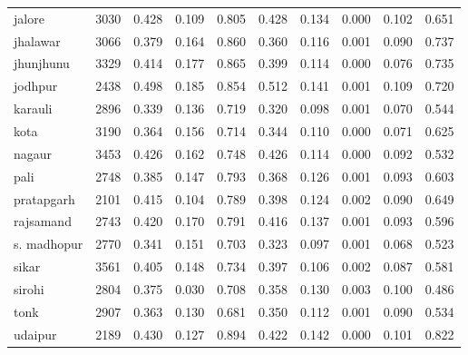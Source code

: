 \begin{table}[!h]
\begin{tabular}[t]{lrrrrrrrrr}
jalore & 3030 & 0.428 & 0.109 & 0.805 & 0.428 & 0.134 & 0.000 & 0.102 & 0.651\\
jhalawar & 3066 & 0.379 & 0.164 & 0.860 & 0.360 & 0.116 & 0.001 & 0.090 & 0.737\\
\addlinespace
jhunjhunu & 3329 & 0.414 & 0.177 & 0.865 & 0.399 & 0.114 & 0.000 & 0.076 & 0.735\\
jodhpur & 2438 & 0.498 & 0.185 & 0.854 & 0.512 & 0.141 & 0.001 & 0.109 & 0.720\\
karauli & 2896 & 0.339 & 0.136 & 0.719 & 0.320 & 0.098 & 0.001 & 0.070 & 0.544\\
kota & 3190 & 0.364 & 0.156 & 0.714 & 0.344 & 0.110 & 0.000 & 0.071 & 0.625\\
nagaur & 3453 & 0.426 & 0.162 & 0.748 & 0.426 & 0.114 & 0.000 & 0.092 & 0.532\\
\addlinespace
pali & 2748 & 0.385 & 0.147 & 0.793 & 0.368 & 0.126 & 0.001 & 0.093 & 0.603\\
pratapgarh & 2101 & 0.415 & 0.104 & 0.789 & 0.398 & 0.124 & 0.002 & 0.090 & 0.649\\
rajsamand & 2743 & 0.420 & 0.170 & 0.791 & 0.416 & 0.137 & 0.001 & 0.093 & 0.596\\
s. madhopur & 2770 & 0.341 & 0.151 & 0.703 & 0.323 & 0.097 & 0.001 & 0.068 & 0.523\\
sikar & 3561 & 0.405 & 0.148 & 0.734 & 0.397 & 0.106 & 0.002 & 0.087 & 0.581\\
\addlinespace
sirohi & 2804 & 0.375 & 0.030 & 0.708 & 0.358 & 0.130 & 0.003 & 0.100 & 0.486\\
tonk & 2907 & 0.363 & 0.130 & 0.681 & 0.350 & 0.112 & 0.001 & 0.090 & 0.534\\
udaipur & 2189 & 0.430 & 0.127 & 0.894 & 0.422 & 0.142 & 0.000 & 0.101 & 0.822\\
\bottomrule
\end{tabular}
\end{table}
